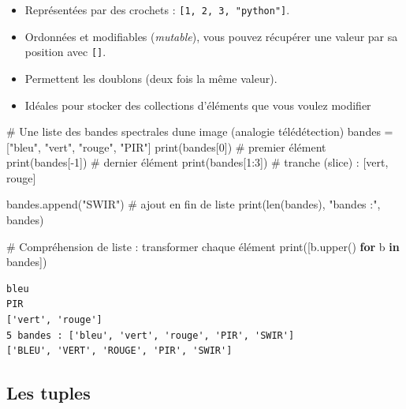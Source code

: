 \documentclass[
  french,
  11pt,
  letterpaper,
  open=any,
  twoside=false,
  french]{scrbook}
\newenvironment{Shaded}{\begin{snugshade}}{\end{snugshade}}
\newcommand{\BuiltInTok}[1]{\textcolor[rgb]{0.00,0.23,0.31}{#1}}
\newcommand{\CommentTok}[1]{\textcolor[rgb]{0.37,0.37,0.37}{#1}}
\newcommand{\ControlFlowTok}[1]{\textcolor[rgb]{0.00,0.23,0.31}{\textbf{#1}}}
\newcommand{\DecValTok}[1]{\textcolor[rgb]{0.68,0.00,0.00}{#1}}
\newcommand{\KeywordTok}[1]{\textcolor[rgb]{0.00,0.23,0.31}{\textbf{#1}}}
\newcommand{\NormalTok}[1]{\textcolor[rgb]{0.00,0.23,0.31}{#1}}
\newcommand{\OperatorTok}[1]{\textcolor[rgb]{0.37,0.37,0.37}{#1}}
\newcommand{\StringTok}[1]{\textcolor[rgb]{0.13,0.47,0.30}{#1}}
\begin{document}
\begin{itemize}
\item
  Représentées par des crochets : \texttt{{[}1,\ 2,\ 3,\ "python"{]}}.
\item
  Ordonnées et modifiables (\emph{mutable}), vous pouvez récupérer une
  valeur par sa position avec \texttt{{[}{]}}.
\item
  Permettent les doublons (deux fois la même valeur).
\item
  Idéales pour stocker des collections d'éléments que vous voulez
  modifier
\end{itemize}

\begin{Shaded}
\begin{Highlighting}[]
\CommentTok{\# Une liste des bandes spectrales d\textquotesingle{}une image (analogie télédétection)}
\NormalTok{bandes }\OperatorTok{=}\NormalTok{ [}\StringTok{"bleu"}\NormalTok{, }\StringTok{"vert"}\NormalTok{, }\StringTok{"rouge"}\NormalTok{, }\StringTok{"PIR"}\NormalTok{]}
\BuiltInTok{print}\NormalTok{(bandes[}\DecValTok{0}\NormalTok{])          }\CommentTok{\# premier élément}
\BuiltInTok{print}\NormalTok{(bandes[}\OperatorTok{{-}}\DecValTok{1}\NormalTok{])         }\CommentTok{\# dernier élément}
\BuiltInTok{print}\NormalTok{(bandes[}\DecValTok{1}\NormalTok{:}\DecValTok{3}\NormalTok{])        }\CommentTok{\# tranche (slice) : [\textquotesingle{}vert\textquotesingle{}, \textquotesingle{}rouge\textquotesingle{}]}

\NormalTok{bandes.append(}\StringTok{"SWIR"}\NormalTok{)     }\CommentTok{\# ajout en fin de liste}
\BuiltInTok{print}\NormalTok{(}\BuiltInTok{len}\NormalTok{(bandes), }\StringTok{"bandes :"}\NormalTok{, bandes)}

\CommentTok{\# Compréhension de liste : transformer chaque élément}
\BuiltInTok{print}\NormalTok{([b.upper() }\ControlFlowTok{for}\NormalTok{ b }\KeywordTok{in}\NormalTok{ bandes])}
\end{Highlighting}
\end{Shaded}

\begin{verbatim}
bleu
PIR
['vert', 'rouge']
5 bandes : ['bleu', 'vert', 'rouge', 'PIR', 'SWIR']
['BLEU', 'VERT', 'ROUGE', 'PIR', 'SWIR']
\end{verbatim}

\subsection{Les tuples}\label{les-tuples}
\end{document}
